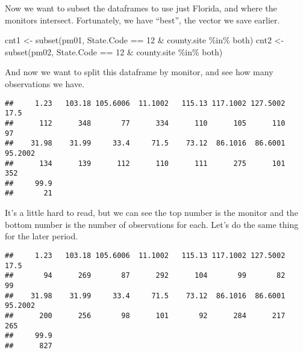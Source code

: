 \documentclass[
]{article}
\newenvironment{Shaded}{\begin{snugshade}}{\end{snugshade}}
\newcommand{\DecValTok}[1]{\textcolor[rgb]{0.00,0.00,0.81}{#1}}
\newcommand{\FunctionTok}[1]{\textcolor[rgb]{0.00,0.00,0.00}{#1}}
\newcommand{\NormalTok}[1]{#1}
\newcommand{\OtherTok}[1]{\textcolor[rgb]{0.56,0.35,0.01}{#1}}
\newcommand{\SpecialCharTok}[1]{\textcolor[rgb]{0.00,0.00,0.00}{#1}}
\begin{document}
Now we want to subset the dataframes to use just Florida, and where the
monitors intersect. Fortunately, we have ``best'', the vector we save
earlier.

\begin{Shaded}
\begin{Highlighting}[]
\NormalTok{cnt1 }\OtherTok{\textless{}{-}} \FunctionTok{subset}\NormalTok{(pm01, State.Code }\SpecialCharTok{==} \DecValTok{12} \SpecialCharTok{\&}\NormalTok{ county.site }\SpecialCharTok{\%in\%}\NormalTok{ both)}
\NormalTok{cnt2 }\OtherTok{\textless{}{-}} \FunctionTok{subset}\NormalTok{(pm02, State.Code }\SpecialCharTok{==} \DecValTok{12} \SpecialCharTok{\&}\NormalTok{ county.site }\SpecialCharTok{\%in\%}\NormalTok{ both)}
\end{Highlighting}
\end{Shaded}

And now we want to split this dataframe by monitor, and see how many
observations we have.

\begin{Shaded}
\end{Shaded}

\begin{verbatim}
##     1.23   103.18 105.6006  11.1002   115.13 117.1002 127.5002     17.5 
##      112      348       77      334      110      105      110       97 
##    31.98    31.99     33.4     71.5    73.12  86.1016  86.6001  95.2002 
##      134      139      112      110      111      275      101      352 
##     99.9 
##       21
\end{verbatim}

It's a little hard to read, but we can see the top number is the monitor
and the bottom number is the number of observations for each. Let's do
the same thing for the later period.

\begin{Shaded}
\end{Shaded}

\begin{verbatim}
##     1.23   103.18 105.6006  11.1002   115.13 117.1002 127.5002     17.5 
##       94      269       87      292      104       99       82       99 
##    31.98    31.99     33.4     71.5    73.12  86.1016  86.6001  95.2002 
##      200      256       98      101       92      284      217      265 
##     99.9 
##      827
\end{verbatim}
\end{document}

